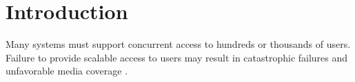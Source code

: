 \documentclass{bmcart}
\begin{document}
\begin{frontmatter}
\begin{abstractbox}

\begin{keyword}
\end{keyword}


\end{abstractbox}
%

\end{frontmatter}




\section{Introduction}

Many systems must support concurrent access to hundreds or thousands of users. Failure to provide scalable access to users may result in catastrophic failures and unfavorable media coverage \citep{Jiang2010}. 
\end{document}
